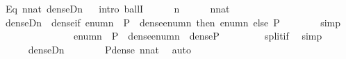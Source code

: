 \begin{isabellebody}
\ Eq{}{\isacharcolon}{\kern0pt}\ {\isachardoublequoteopen}{\isasymforall}n{\isasymin}nat{\isachardot}{\kern0pt}\ dense{\isacharparenleft}{\kern0pt}{\isacharquery}{\kern0pt}D{\isacharbackquote}{\kern0pt}n{\isacharparenright}{\kern0pt}{\isachardoublequoteclose}\isanewline
\ \ \isamarkupfalse%
{\isacharparenleft}{\kern0pt}intro\ ballI{\isacharparenright}{\kern0pt}\isanewline
\ \ \ \ \isamarkupfalse%
\ n\isanewline
\ \ \ \ \isamarkupfalse%
\ {\isachardoublequoteopen}n{\isasymin}nat{\isachardoublequoteclose}\isanewline
\ \ \ \ \isamarkupfalse%
\isanewline
\ \ \ \ \isamarkupfalse%
\ {\isachardoublequoteopen}dense{\isacharparenleft}{\kern0pt}{\isacharquery}{\kern0pt}D{\isacharbackquote}{\kern0pt}n{\isacharparenright}{\kern0pt}\ {\isasymlongleftrightarrow}\ dense{\isacharparenleft}{\kern0pt}if\ enum{\isacharbackquote}{\kern0pt}n\ {\isasymsubseteq}\ P\ {\isasymand}\ dense{\isacharparenleft}{\kern0pt}enum{\isacharbackquote}{\kern0pt}n{\isacharparenright}{\kern0pt}\ then\ enum{\isacharbackquote}{\kern0pt}n\ else\ P{\isacharparenright}{\kern0pt}{\isachardoublequoteclose}\isanewline
\ \ \ \ \ \ \isamarkupfalse%
\ simp\isanewline
\ \ \ \ \isamarkupfalse%
\ \isanewline
\ \ \ \ \isamarkupfalse%
\ {\isachardoublequoteopen}{\isachardot}{\kern0pt}{\isachardot}{\kern0pt}{\isachardot}{\kern0pt}\ {\isasymlongleftrightarrow}\ \ {\isacharparenleft}{\kern0pt}{\isasymnot}{\isacharparenleft}{\kern0pt}enum{\isacharbackquote}{\kern0pt}n\ {\isasymsubseteq}\ P\ {\isasymand}\ dense{\isacharparenleft}{\kern0pt}enum{\isacharbackquote}{\kern0pt}n{\isacharparenright}{\kern0pt}{\isacharparenright}{\kern0pt}\ {\isasymlongrightarrow}\ dense{\isacharparenleft}{\kern0pt}P{\isacharparenright}{\kern0pt}{\isacharparenright}{\kern0pt}\ {\isachardoublequoteclose}\isanewline
\ \ \ \ \ \ \isamarkupfalse%
\ split{\isacharunderscore}{\kern0pt}if\ \isamarkupfalse%
\ simp\isanewline
\ \ \ \ \isamarkupfalse%
\isanewline
\ \ \ \ \isamarkupfalse%
\ {\isachardoublequoteopen}dense{\isacharparenleft}{\kern0pt}{\isacharquery}{\kern0pt}D{\isacharbackquote}{\kern0pt}n{\isacharparenright}{\kern0pt}{\isachardoublequoteclose}\isanewline
\ \ \ \ \ \ \isamarkupfalse%
\ P{\isacharunderscore}{\kern0pt}dense\ {\isacartoucheopen}n{\isasymin}nat{\isacartoucheclose}\ \isamarkupfalse%
\ auto\isanewline
\ \ \isamarkupfalse%
\isanewline
\ \ \isamarkupfalse%

\end{isabellebody}
